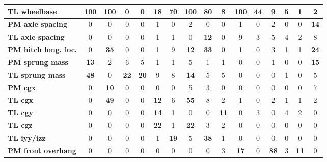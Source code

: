 \begin{table}[H]
\begin{tabular}{|l|c|c|c|c|c|c|c|c|c|c|c|c|c|c|c|}
\hline
\textcolor[rgb]{0.851, 0.373, 0.008}{\textbf{TL wheelbase}} & \textcolor[rgb]{0.835, 0.369, 0.000}{\textbf{100}} & \textcolor[rgb]{0.835, 0.369, 0.000}{\textbf{100}} & 0 & 0 & \textbf{18} & \textcolor[rgb]{0.000, 0.447, 0.698}{\textbf{70}} & \textcolor[rgb]{0.835, 0.369, 0.000}{\textbf{100}} & \textcolor[rgb]{0.000, 0.447, 0.698}{\textbf{80}} & 8 & \textcolor[rgb]{0.835, 0.369, 0.000}{\textbf{100}} & \textcolor[rgb]{0.000, 0.620, 0.451}{\textbf{44}} & 9 & 5 & 1 & 2 \\
\hline
\textbf{PM axle spacing} & 0 & 0 & 0 & 0 & 1 & 0 & 2 & 0 & 0 & 1 & 0 & 2 & 0 & 0 & \textbf{14} \\
\hline
\textbf{TL axle spacing} & 0 & 0 & 0 & 0 & 1 & 1 & 0 & \textbf{12} & 0 & 9 & 3 & 5 & 4 & 2 & 8 \\
\hline
\textcolor[rgb]{0.000, 0.620, 0.451}{\textbf{PM hitch long. loc.}} & 0 & \textcolor[rgb]{0.000, 0.620, 0.451}{\textbf{35}} & 0 & 0 & 1 & 9 & \textbf{12} & \textcolor[rgb]{0.000, 0.620, 0.451}{\textbf{33}} & 0 & 1 & 0 & 3 & 1 & 1 & \textbf{24} \\
\hline
\textbf{PM sprung mass} & \textbf{13} & 2 & 6 & 5 & 1 & 1 & 5 & 1 & 1 & 0 & 0 & 1 & 0 & 0 & \textbf{15} \\
\hline
\textcolor[rgb]{0.000, 0.620, 0.451}{\textbf{TL sprung mass}} & \textcolor[rgb]{0.000, 0.620, 0.451}{\textbf{48}} & 0 & \textbf{22} & \textbf{20} & 9 & 8 & \textbf{14} & 5 & 5 & 0 & 0 & 0 & 1 & 0 & 5 \\
\hline
\textbf{PM \gls{cgx}} & 0 & \textbf{10} & 0 & 0 & 0 & 0 & 5 & 3 & 0 & 0 & 0 & 0 & 0 & 0 & 7 \\
\hline
\textcolor[rgb]{0.000, 0.447, 0.698}{\textbf{TL \gls{cgx}}} & 0 & \textcolor[rgb]{0.000, 0.620, 0.451}{\textbf{49}} & 0 & 0 & \textbf{12} & 6 & \textcolor[rgb]{0.000, 0.447, 0.698}{\textbf{55}} & 8 & 2 & 1 & 0 & 2 & 1 & 1 & 2 \\
\hline
\textbf{TL \gls{cgy}} & 0 & 0 & 0 & 0 & \textbf{14} & 1 & 0 & 0 & \textbf{11} & 0 & 3 & 0 & 4 & 2 & 0 \\
\hline
\textbf{TL \gls{cgz}} & 0 & 0 & 0 & 0 & \textbf{22} & 1 & \textbf{22} & 3 & 2 & 0 & 0 & 0 & 0 & 0 & 0 \\
\hline
\textcolor[rgb]{0.000, 0.620, 0.451}{\textbf{TL \gls{iyy}/\gls{izz}}} & 0 & 0 & 0 & 0 & 1 & \textbf{19} & 5 & \textcolor[rgb]{0.000, 0.620, 0.451}{\textbf{38}} & 1 & 0 & 0 & 0 & 0 & 0 & 0 \\
\hline
\textcolor[rgb]{0.000, 0.447, 0.698}{\textbf{PM front overhang}} & 0 & 0 & 0 & 0 & 0 & 0 & 0 & 0 & 3 & \textbf{17} & 0 & \textcolor[rgb]{0.000, 0.447, 0.698}{\textbf{88}} & 3 & \textbf{11} & 0 \\

\end{tabular}
\end{table}
